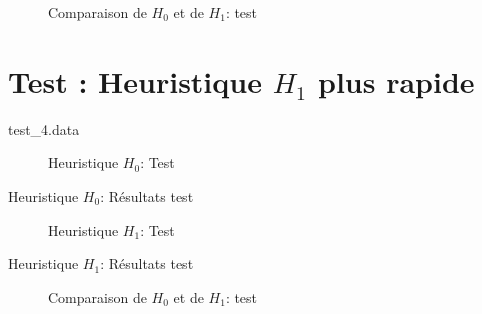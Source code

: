   \begin{figure}[H]
    \centering
    \boxed{
    \begin{tikzpicture}[yscale=0.2]
      
    \end{tikzpicture}}
    \caption{Comparaison de $H_0$ et de $H_1$: test }
    \label{fig:comp_3}
  \end{figure}

  \section{Test : Heuristique $H_1$ plus rapide}
  \begin{listing}[H]
    \caption{test\_4.data}
  \end{listing}

  \begin{figure}[H]
    \begin{center}
      \boxed{
      \begin{tikzpicture}[scale=0.5]
        
      \end{tikzpicture}}
    \end{center}
    \caption{Heuristique $H_0$: Test }
    \label{fig:H0_4}
  \end{figure}

  \begin{table}[H]
    \centering
    
    \caption{Heuristique $H_0$: Résultats test }
    \label{tab:H0_4}
  \end{table}

  \begin{figure}[H]
    \begin{center}
      \boxed{
      \begin{tikzpicture}[scale=1]
        
      \end{tikzpicture}}
    \end{center}
    \caption{Heuristique $H_1$: Test }
    \label{fig:H1_4}
  \end{figure}

  \begin{table}[H]
    \centering
    
    \caption{Heuristique $H_1$: Résultats test }
    \label{tab:H1_4}
  \end{table}

  \begin{figure}[H]
    \centering
    \boxed{
    \begin{tikzpicture}[yscale=0.35]
      
    \end{tikzpicture}}
    \caption{Comparaison de $H_0$ et de $H_1$: test }
    \label{fig:comp_4}
  \end{figure}
